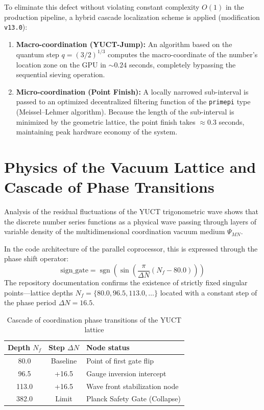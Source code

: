 \documentclass[11pt,a4paper]{article}
\begin{document}
	To eliminate this defect without violating constant complexity $O(1)$ in the production pipeline, a hybrid cascade localization scheme is applied (modification \texttt{v13.0}):
	\begin{enumerate}
		\item \textbf{Macro-coordination (YUCT-Jump):} An algorithm based on the quantum step $q = (3/2)^{1/3}$ computes the macro-coordinate of the number's location zone on the GPU in $\sim 0.24$ seconds, completely bypassing the sequential sieving operation.
		\item \textbf{Micro-coordination (Point Finish):} A locally narrowed sub-interval is passed to an optimized decentralized filtering function of the \texttt{primepi} type (Meissel–Lehmer algorithm). Because the length of the sub-interval is minimized by the geometric lattice, the point finish takes $\approx 0.3$ seconds, maintaining peak hardware economy of the system.
	\end{enumerate}
	
	\section{Physics of the Vacuum Lattice and Cascade of Phase Transitions}
	Analysis of the residual fluctuations of the YUCT trigonometric wave shows that the discrete number series functions as a physical wave passing through layers of variable density of the multidimensional coordination vacuum medium $\Psi_{MN}$.
	
	In the code architecture of the parallel coprocessor, this is expressed through the phase shift operator:
	\begin{equation}
		\mathrm{sign\_gate} = \operatorname{sgn}\!\left(\sin\!\left(\frac{\pi}{\Delta N} (N_f - 80.0)\right)\right)
	\end{equation}
	The repository documentation confirms the existence of strictly fixed singular points—lattice depths $N_f = \{80.0, 96.5, 113.0, \dots\}$ located with a constant step of the phase period $\Delta N = 16.5$.
	
	\begin{table}[h!]
		\centering
		\caption{Cascade of coordination phase transitions of the YUCT lattice}
		\label{tab:phase_transitions}
		\small
		\begin{tabular}{ccl}
			\toprule
			\textbf{Depth $N_f$} & \textbf{Step $\Delta N$} & \textbf{Node status} \\
			\midrule
			80.0  & Baseline & Point of first gate flip \\
			96.5  & +16.5 & Gauge inversion intercept \\
			113.0 & +16.5 & Wave front stabilization node \\
			382.0 & Limit  & Planck Safety Gate (Collapse) \\
			\bottomrule
		\end{tabular}
	\end{table}
	
\end{document}
